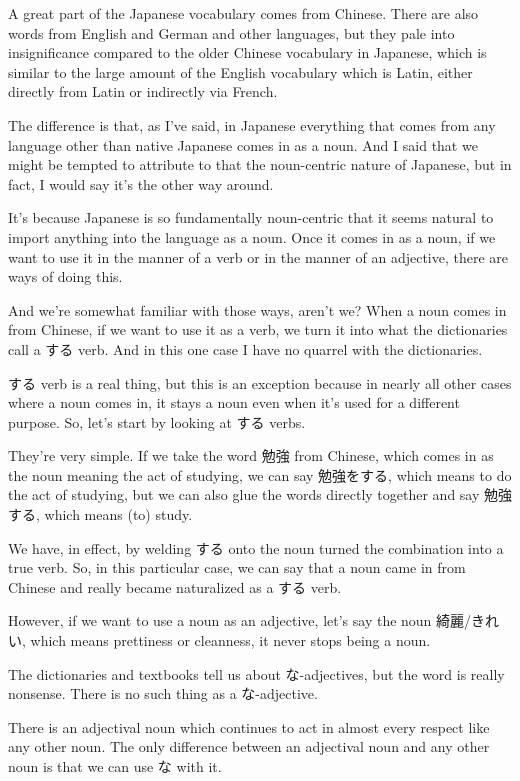 A great part of the Japanese vocabulary comes from Chinese. There are also words from English and German and other languages, but they pale into insignificance compared to the older Chinese vocabulary in Japanese, which is similar to the large amount of the English vocabulary which is Latin, either directly from Latin or indirectly via French.

The difference is that, as I've said, in Japanese everything that comes from any language other than native Japanese comes in as a noun. And I said that we might be tempted to attribute to that the noun-centric nature of Japanese, but in fact, I would say it's the other way around.

It's because Japanese is so fundamentally noun-centric that it seems natural to import anything into the language as a noun. Once it comes in as a noun, if we want to use it in the manner of a verb or in the manner of an adjective, there are ways of doing this.

And we're somewhat familiar with those ways, aren't we? When a noun comes in from Chinese, if we want to use it as a verb, we turn it into what the dictionaries call a する verb. And in this one case I have no quarrel with the dictionaries.

する verb is a real thing, but this is an exception because in nearly all other cases where a noun comes in, it stays a noun even when it's used for a different purpose. So, let's start by looking at する verbs.

They're very simple. If we take the word 勉強 from Chinese, which comes in as the noun meaning the act of studying, we can say 勉強をする, which means to do the act of studying, but we can also glue the words directly together and say 勉強する, which means (to) study.

We have, in effect, by welding する onto the noun turned the combination into a true verb. So, in this particular case, we can say that a noun came in from Chinese and really became naturalized as a する verb.

However, if we want to use a noun as an adjective, let's say the noun 綺麗/きれい, which means prettiness or cleanness, it never stops being a noun.

{}

The dictionaries and textbooks tell us about な-adjectives, but the word is really nonsense. There is no such thing as a な-adjective.

There is an adjectival noun which continues to act in almost every respect like any other noun. The only difference between an adjectival noun and any other noun is that we can use な with it.

